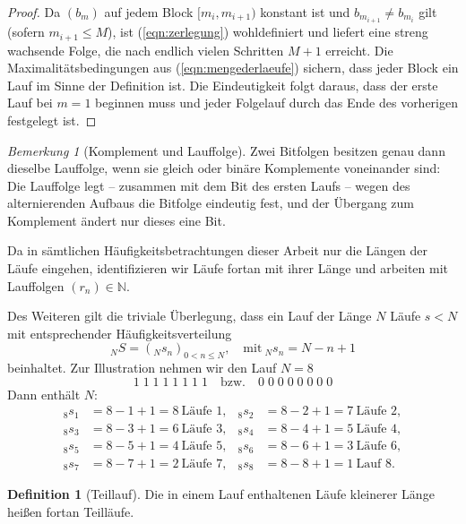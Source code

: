 \documentclass[11pt,a4paper]{scrartcl}
\theoremstyle{plain}
\theoremstyle{definition}
\newtheorem{defi}[satz]{Definition}
\theoremstyle{remark}
\newtheorem{bem}[satz]{Bemerkung}
\begin{document}
\begin{proof}
Da $(b_m)$ auf jedem Block $[m_i,m_{i+1})$ konstant ist und
$b_{m_{i+1}}\neq b_{m_i}$ gilt (sofern $m_{i+1}\leq M$), ist
(\ref{eqn:zerlegung}) wohldefiniert und liefert eine streng wachsende
Folge, die nach endlich vielen Schritten $M+1$ erreicht. Die
Maximalitätsbedingungen aus (\ref{eqn:mengederlaeufe}) sichern, dass
jeder Block ein Lauf im Sinne der Definition ist. Die Eindeutigkeit
folgt daraus, dass der erste Lauf bei $m=1$ beginnen muss und jeder
Folgelauf durch das Ende des vorherigen festgelegt ist.
\end{proof}

\begin{bem}[Komplement und Lauffolge]\label{bem:komplement}
Zwei Bitfolgen besitzen genau dann dieselbe Lauffolge, wenn sie gleich
oder binäre Komplemente voneinander sind: Die Lauffolge legt -- zusammen
mit dem Bit des ersten Laufs -- wegen des alternierenden Aufbaus die
Bitfolge eindeutig fest, und der Übergang zum Komplement ändert nur
dieses eine Bit.
\end{bem}

\noindent Da in sämtlichen Häufigkeitsbetrachtungen dieser Arbeit nur die
Längen der Läufe eingehen, identifizieren wir Läufe fortan mit ihrer
Länge und arbeiten mit Lauffolgen $(r_n)\in\mathbb N$.

Des Weiteren gilt die triviale Überlegung, dass ein Lauf der Länge
$N$ Läufe $s<N$ mit entsprechender Häufigkeitsverteilung
\begin{equation}\label{eqn:haufigkeitenteillaeufe}
  _NS=(_Ns_n)_{0<n\leq N},\quad\text{mit}\ _Ns_n=N-n+1
\end{equation}
beinhaltet. Zur Illustration nehmen wir den Lauf $N=8$
\begin{equation}\label{eqn:teillaufindemlauf}
  1\;1\;1\;1\;1\;1\;1\;1\quad\text{bzw.}\quad 0\;0\;0\;0\;0\;0\;0\;0
\end{equation}
Dann enthält $N$:
\begin{align*}
  {}_8s_1&=8-1+1=8\ \text{Läufe } 1, & {}_8s_2&=8-2+1=7\ \text{Läufe } 2,\\
  {}_8s_3&=8-3+1=6\ \text{Läufe } 3, & {}_8s_4&=8-4+1=5\ \text{Läufe } 4,\\
  {}_8s_5&=8-5+1=4\ \text{Läufe } 5, & {}_8s_6&=8-6+1=3\ \text{Läufe } 6,\\
  {}_8s_7&=8-7+1=2\ \text{Läufe } 7, & {}_8s_8&=8-8+1=1\ \text{Lauf } 8.
\end{align*}

\begin{defi}[Teillauf]\label{defi:teillauf}
Die in einem Lauf enthaltenen Läufe kleinerer Länge heißen fortan
Teilläufe.
\end{defi}
\end{document}
